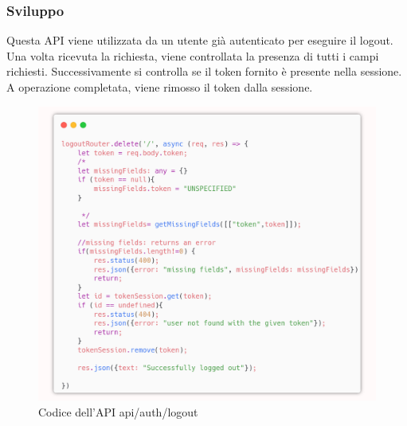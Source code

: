 \documentclass{report}
\begin{document}
\subsubsection*{Sviluppo}
Questa API viene utilizzata da un utente già autenticato per eseguire il logout.
Una volta ricevuta la richiesta, viene controllata la presenza di tutti i campi richiesti.
Successivamente si controlla se il token fornito è presente nella sessione.
A operazione completata, viene rimosso il token dalla sessione.


\begin{figure}[H]
	\centering\includegraphics[width=1\textwidth]{images/microservizio-autenticazione/logout-carbon.png}
	Codice dell'API api/auth/logout
\end{figure}
\end{document}

